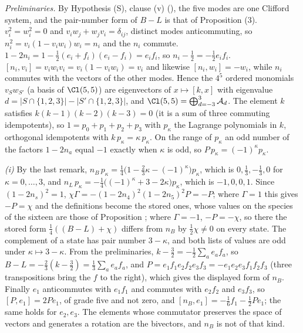 \emph{Preliminaries.} By Hypothesis (S), clause (v) (), the five modes are one Clifford system, and the pair-number form of $B - L$ is that of Proposition (3). $v_{i}^{2} = w_{i}^{2} = 0$ and $v_{i}w_{j} + w_{j}v_{i} = \delta_{ij}$, distinct modes anticommuting, so $n_{i}^{2} = v_{i}(1 - v_{i}w_{i})w_{i} = n_{i}$ and the $n_{i}$ commute. $1 - 2n_{i} = 1 - \tfrac12(e_{i} + f_{i})(e_{i} - f_{i}) = e_{i}f_{i}$, so $n_{i} - \tfrac12 = -\tfrac12 e_{i}f_{i}$. $[n_{i}, v_{i}] = v_{i}w_{i}v_{i} = v_{i}(1 - v_{i}w_{i}) = v_{i}$ and likewise $[n_{i}, w_{i}] = -w_{i}$, while $n_{i}$ commutes with the vectors of the other modes. Hence the $4^{5}$ ordered monomials $v_{S}w_{S'}$ (a basis of $\Cl(5,5)$) are eigenvectors of $x \mapsto [k, x]$ with eigenvalue $d = |S \cap \{1,2,3\}| - |S' \cap \{1,2,3\}|$, and $\Cl(5,5) = \bigoplus_{d = -3}^{3}\mathcal{A}_{d}$. The element $k$ satisfies $k(k-1)(k-2)(k-3) = 0$ (it is a sum of three commuting idempotents), so $1 = p_{0} + p_{1} + p_{2} + p_{3}$ with $p_{\kappa}$ the Lagrange polynomials in $k$, orthogonal idempotents with $k\,p_{\kappa} = \kappa\,p_{\kappa}$. On the range of $p_{\kappa}$ an odd number of the factors $1 - 2n_{a}$ equal $-1$ exactly when $\kappa$ is odd, so $P\,p_{\kappa} = (-1)^{\kappa}p_{\kappa}$.

\emph{(i)} By the last remark, $n_{B}\,p_{\kappa} = \tfrac14\bigl(1 - \tfrac23\kappa - (-1)^{\kappa}\bigr)p_{\kappa}$, which is $0, \tfrac13, -\tfrac13, 0$ for $\kappa = 0, \dots, 3$, and $n_{L}\,p_{\kappa} = -\tfrac14\bigl((-1)^{\kappa} + 3 - 2\kappa\bigr)p_{\kappa}$, which is $-1, 0, 0, 1$. Since $(1 - 2n_{s})^{2} = 1$, $\chi\Gamma = -(1 - 2n_{4})^{2}(1 - 2n_{5})^{2}P = -P$; where $\Gamma = 1$ this gives $-P = \chi$ and the definitions become the stored ones, whose values on the species of the sixteen are those of Proposition ; where $\Gamma = -1$, $-P = -\chi$, so there the stored form $\tfrac14((B - L) + \chi)$ differs from $n_{B}$ by $\tfrac12\chi \ne 0$ on every state. The complement of a state has pair number $3 - \kappa$, and both lists of values are odd under $\kappa \mapsto 3 - \kappa$. From the preliminaries, $k - \tfrac32 = -\tfrac12\sum_{a}e_{a}f_{a}$, so $B - L = -\tfrac23(k - \tfrac32) = \tfrac13\sum_{a}e_{a}f_{a}$, and $P = e_{1}f_{1}e_{2}f_{2}e_{3}f_{3} = -e_{1}e_{2}e_{3}f_{1}f_{2}f_{3}$ (three transpositions bring the $f$ to the right), which gives the displayed form of $n_{B}$. Finally $e_{1}$ anticommutes with $e_{1}f_{1}$ and commutes with $e_{2}f_{2}$ and $e_{3}f_{3}$, so $[P, e_{1}] = 2Pe_{1}$, of grade five and not zero, and $[n_{B}, e_{1}] = -\tfrac16 f_{1} - \tfrac12 Pe_{1}$; the same holds for $e_{2}, e_{3}$. The elements whose commutator preserves the space of vectors and generates a rotation are the bivectors, and $n_{B}$ is not of that kind.

